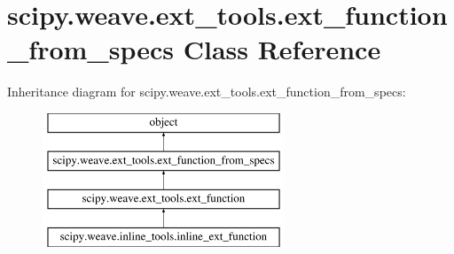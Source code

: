 \hypertarget{classscipy_1_1weave_1_1ext__tools_1_1ext__function__from__specs}{}\section{scipy.\+weave.\+ext\+\_\+tools.\+ext\+\_\+function\+\_\+from\+\_\+specs Class Reference}
\label{classscipy_1_1weave_1_1ext__tools_1_1ext__function__from__specs}
Inheritance diagram for scipy.\+weave.\+ext\+\_\+tools.\+ext\+\_\+function\+\_\+from\+\_\+specs\+:\begin{figure}[H]
\begin{center}
\leavevmode
\includegraphics[height=4.000000cm]{classscipy_1_1weave_1_1ext__tools_1_1ext__function__from__specs}
\end{center}
\end{figure}
